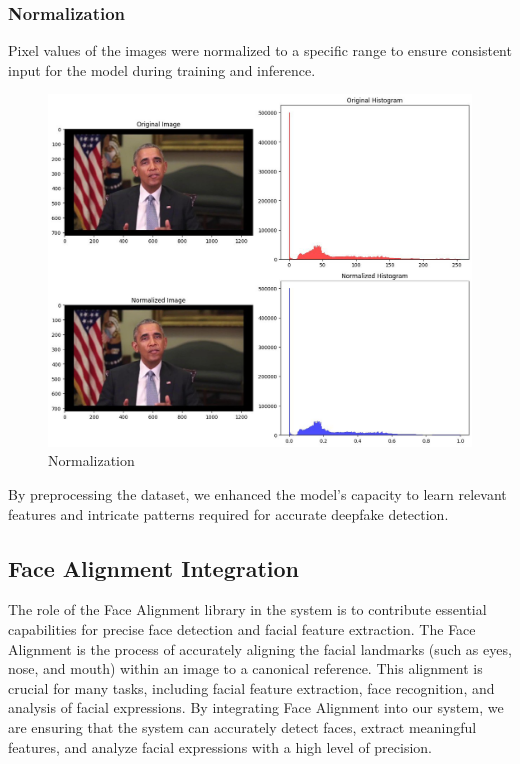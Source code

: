 \subsubsection{Normalization} Pixel values of the images were normalized to a specific range to ensure consistent input for the model during training and inference.

\begin{figure}[htbp]
    \centering
    \includegraphics[width=5in]{img/normalized.jpg}
    \caption{Normalization}
\end{figure}

\noindent By preprocessing the dataset, we enhanced the model's capacity to learn relevant features and intricate patterns required for accurate deepfake detection.

\subsection{Face Alignment Integration}

The role of the Face Alignment library in the system is to contribute essential capabilities for precise face detection and facial feature extraction. The Face Alignment is the process of accurately aligning the facial landmarks (such as eyes, nose, and mouth) within an image to a canonical reference. This alignment is crucial for many tasks, including facial feature extraction, face recognition, and analysis of facial expressions. By integrating Face Alignment into our system, we are ensuring that the system can accurately detect faces, extract meaningful features, and analyze facial expressions with a high level of precision.

